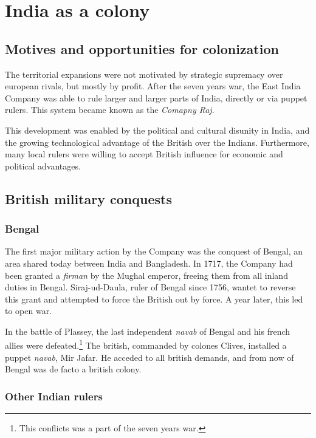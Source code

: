 \documentclass[11pt, a4paper, headings=standardclasses]{scrartcl}
\begin{document}
\section{India as a colony}

\subsection{Motives and opportunities for colonization}

The territorial expansions were not motivated by strategic supremacy over european rivals, but mostly by profit. After the seven years war, the East India Company was able to rule larger and larger parts of India, directly or via puppet rulers. This system became known as the \textit{Comapny Raj}.\autocite{parliament}

This development was enabled by the political and cultural disunity in India, and the growing technological advantage of the British over the Indians. Furthermore, many local rulers were willing to accept British influence for economic and political advantages.

\subsection{British military conquests}

\subsubsection{Bengal}
The first major military action by the Company was the conquest of Bengal, an area shared today between India and Bangladesh. In 1717, the Company had been granted a \textit{firman} by the Mughal emperor, freeing them from all inland duties in Bengal.\autocite[257]{RF} Siraj-ud-Daula, ruler of Bengal since 1756, wantet to reverse this grant and attempted to force the British out by force. A year later, this led to open war.\autocite[258]{RF}

In the battle of Plassey, the last independent \textit{navab} of Bengal and his french allies were defeated.\footnote{This conflicts was a part of the seven years war.} The british, commanded by colones Clives, installed a puppet \textit{navab}, Mir Jafar. He acceded to all british demands, and from now of Bengal was de facto a british colony.\autocite[268]{RF}

\subsubsection{Other Indian rulers}
\end{document}
